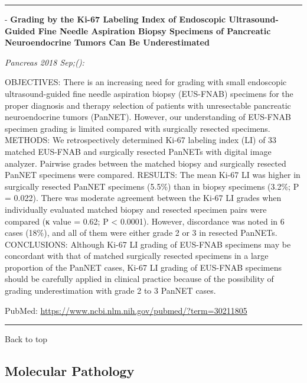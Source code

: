 \documentclass[]{article}
\begin{document}
\begin{center}\rule{0.5\linewidth}{\linethickness}\end{center}

 - \textbf{Grading by the Ki-67 Labeling Index of Endoscopic
Ultrasound-Guided Fine Needle Aspiration Biopsy Specimens of Pancreatic
Neuroendocrine Tumors Can Be Underestimated}

\emph{Pancreas 2018 Sep;():}

OBJECTIVES: There is an increasing need for grading with small
endoscopic ultrasound-guided fine needle aspiration biopsy (EUS-FNAB)
specimens for the proper diagnosis and therapy selection of patients
with unresectable pancreatic neuroendocrine tumors (PanNET). However,
our understanding of EUS-FNAB specimen grading is limited compared with
surgically resected specimens. METHODS: We retrospectively determined
Ki-67 labeling index (LI) of 33 matched EUS-FNAB and surgically resected
PanNETs with digital image analyzer. Pairwise grades between the matched
biopsy and surgically resected PanNET specimens were compared. RESULTS:
The mean Ki-67 LI was higher in surgically resected PanNET specimens
(5.5\%) than in biopsy specimens (3.2\%; P = 0.022). There was moderate
agreement between the Ki-67 LI grades when individually evaluated
matched biopsy and resected specimen pairs were compared (κ value =
0.62; P \textless{} 0.0001). However, discordance was noted in 6 cases
(18\%), and all of them were either grade 2 or 3 in resected PanNETs.
CONCLUSIONS: Although Ki-67 LI grading of EUS-FNAB specimens may be
concordant with that of matched surgically resected specimens in a large
proportion of the PanNET cases, Ki-67 LI grading of EUS-FNAB specimens
should be carefully applied in clinical practice because of the
possibility of grading underestimation with grade 2 to 3 PanNET cases.

PubMed: \url{https://www.ncbi.nlm.nih.gov/pubmed/?term=30211805}

{}

{}

\begin{center}\rule{0.5\linewidth}{\linethickness}\end{center}

Back to top

\pagebreak

\hypertarget{molecular-pathology}{%
\subsection{Molecular Pathology}\label{molecular-pathology}}
\end{document}
